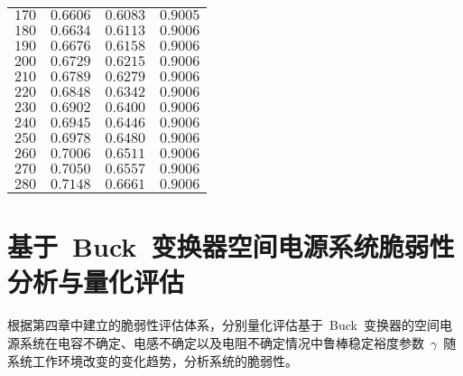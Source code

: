 \begin{center}
\begin{supertabular}{C{3cm}C{3cm}C{3cm}C{3cm}}
        $170$                    & $0.6606$              & $0.6083$             & $0.9005$        \\ 

        $180$                    & $0.6634$              & $0.6113$             & $0.9006$        \\ 

        $190$                    & $0.6676$              & $0.6158$             & $0.9006$        \\  

        $200$                    & $0.6729$              & $0.6215$             & $0.9006$        \\  

        $210$                    & $0.6789$              & $0.6279$             & $0.9006$        \\ 

        $220$                    & $0.6848$              & $0.6342$             & $0.9006$        \\ 

        $230$                    & $0.6902$              & $0.6400$             & $0.9006$        \\

        $240$                    & $0.6945$              & $0.6446$             & $0.9006$        \\ 

        $250$                    & $0.6978$              & $0.6480$             & $0.9006$        \\ 

        $260$                    & $0.7006$              & $0.6511$             & $0.9006$        \\  

        $270$                    & $0.7050$              & $0.6557$             & $0.9006$        \\

        $280$                    & $0.7148$              & $0.6661$             & $0.9006$        \\ 
\end{supertabular}
\end{center}
\section{基于~Buck~变换器空间电源系统脆弱性分析与量化评估}
\label{sub:chap5:fraeva}
根据第四章中建立的脆弱性评估体系，分别量化评估基于~Buck~变换器的空间电源系统在电容不确定、电感不确定以及电阻不确定情况中鲁棒稳定裕度参数~$\gamma$~随系统工作环境改变的变化趋势，分析系统的脆弱性。
